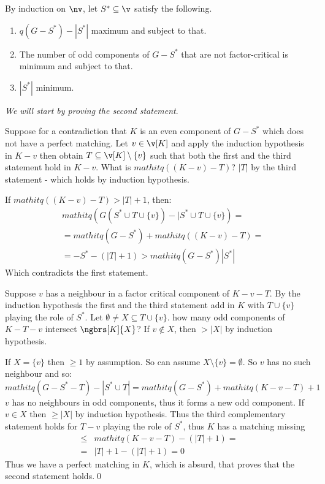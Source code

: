 \begin{prf}
    By induction on $\nv$, let $S^* \subseteq \v$ satisfy the following.
    \begin{enumerate}[label=\alph*)]
        \item $\mathit{q}(G - S^*) - |S^*|$ maximum and subject to that.
        \item The number of odd components of $G - S^*$ that are not factor-critical is minimum and subject to that.
        \item $|S^*|$ minimum.
    \end{enumerate}
    \textit{We will start by proving the second statement}.

    Suppose for a contradiction that $K$ is an even component of $G - S^*$ which does not have a perfect matching. Let $v \in \v[K]$ and apply the induction hypothesis in $K - v$ then obtain $T \subseteq \v[K] \setminus \{v\}$ such that both the first and the third statement hold in $K - v$. What is $mathit{q}((K - v) - T)$? $|T|$ by the third statement - which holds by induction hypothesis.

    If $mathit{q}((K - v) - T) > |T| + 1$, then:
    \begin{align*}
        & mathit{q}(G(S^* \cup T \cup \{v\}) - |S^* \cup T \cup \{v\}) = \\
        &= mathit{q}(G - S^*) + mathit{q}((K - v) - T) =\\
        &= - S^* - (|T| + 1) > mathit{q}(G - S^*) |S^*|
    \end{align*}
    Which contradicts the first statement.

    Suppose $v$ has a neighbour in a factor critical component of $K - v - T$. By the induction hypothesis the first and the third statement add in $K$ with $T \cup \{v\}$ playing the role of $S^*$. Let $\emptyset \neq X \subseteq T \cup \{v\}$. how many odd components of $K - T - v$ intersect $\ngbrs[K]{X}$? If $v \notin X$, then $> |X|$ by induction hypothesis.

    If $X = \{v\}$ then $\geq 1$ by assumption. So can assume $X \setminus \{v\} = \emptyset$. So $v$ has no such neighbour and so:
    \begin{equation*}
        mathit{q}(G - S^* - T) - |S^* \cup T| = mathit{q}(G - S^*) + mathit{q}(K - v - T) + 1
    \end{equation*}
    $v$ has no neighbours in odd components, thus it forms a new odd component. If $v \in X$ then $\geq |X|$ by induction hypothesis. Thus the third complementary statement holds for $T - v$ playing the role of $S^*$, thus $K$ has a matching missing
    \begin{align*}
        \leq &mathit{q}(K - v - T) - (|T| + 1) =\\
        = &|T| + 1 - (|T| + 1) = 0
    \end{align*}
    Thus we have a perfect matching in $K$, which is absurd, that proves that the second statement holds.\qed


\end{prf}

